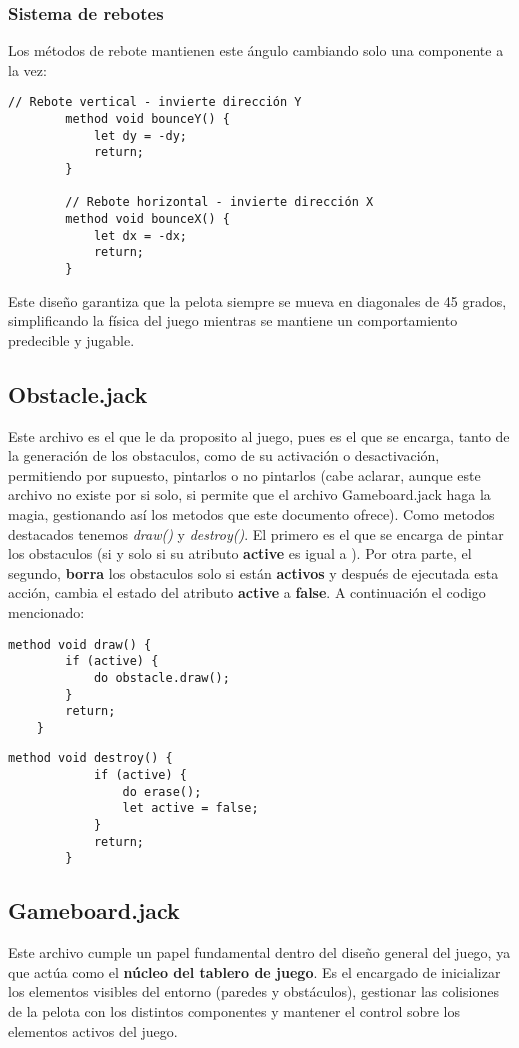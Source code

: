 \documentclass[twocolumn]{article}
\begin{document}
	\subsubsection{Sistema de rebotes}
	Los métodos de rebote mantienen este ángulo cambiando solo una componente a la vez:
	
	\begin{lstlisting}[caption=Métodos de rebote]
		// Rebote vertical - invierte dirección Y
		method void bounceY() {
			let dy = -dy;
			return;
		}
		
		// Rebote horizontal - invierte dirección X  
		method void bounceX() {
			let dx = -dx;
			return;
		}
	\end{lstlisting}
	
	Este diseño garantiza que la pelota siempre se mueva en diagonales de 45 grados, simplificando la física del juego mientras se mantiene un comportamiento predecible y jugable.
	\subsection{Obstacle.jack}
	Este archivo es el que le da proposito al juego, pues es el que se encarga, tanto de la generación de los obstaculos, como de su activación o desactivación, permitiendo por supuesto, pintarlos o no pintarlos (cabe aclarar, aunque este archivo no existe por si solo, si permite que el archivo Gameboard.jack haga la magia, gestionando así los metodos que este documento ofrece). Como metodos destacados tenemos \emph{draw()} y \emph{destroy()}. El primero es el que se encarga de pintar los obstaculos (si y solo si su atributo \textbf{active} es igual a ). Por otra parte, el segundo, \textbf{borra} los obstaculos solo si están \textbf{activos} y después de ejecutada esta acción, cambia el estado del atributo \textbf{active} a \textbf{false}. A continuación el codigo mencionado: 
	\begin{lstlisting}[caption=Método draw de los obstaculos]
	method void draw() {
		if (active) {
			do obstacle.draw();
		}
		return;
	}
	\end{lstlisting}
	\begin{lstlisting}[caption=Método destroy de los obstaculos]
		method void destroy() {
			if (active) {
				do erase();
				let active = false;
			}
			return;
		}
	\end{lstlisting}
	\subsection{Gameboard.jack}
	Este archivo cumple un papel fundamental dentro del diseño general del juego, ya que actúa como el \textbf{núcleo del tablero de juego}. Es el encargado de inicializar los elementos visibles del entorno (paredes y obstáculos), gestionar las colisiones de la pelota con los distintos componentes y mantener el control sobre los elementos activos del juego. 
	
\end{document}
